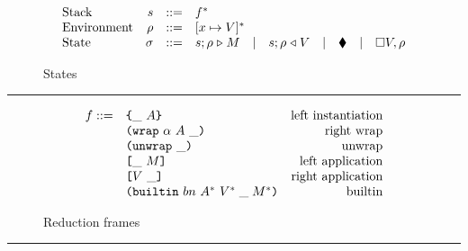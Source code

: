 \begin{figure*}[!ht]
\caption{The CEK Machine}\label{fig:cek-machine}

\begin{subfigure}[c]{\linewidth}        %
{\small
\caption{States}
\[
\begin{array}{lrcl}
        \textrm{Stack} & s      & ::= & f^*    \\
        \textrm{Environment} & \rho & ::= & [x \mapsto V]^* \\
        \textrm{State} & \sigma & ::= & s;\rho \mathrel\triangleright M \quad | \quad s;\rho \mathrel\triangleleft V  \quad | \quad \blacklozenge{} \quad | \quad \square V,\rho
    \end{array}
\]
}
\end{subfigure}

\vspace{3mm}
\hrule
\vspace{3mm}

\begin{subfigure}[c]{\linewidth}  %
{\small
\caption{Reduction frames}
\[
    \begin{array}{rlr}
       f ::= & \texttt{\{}\_ ~ A\texttt{\}}                     & \textrm{left instantiation}\\
             & \texttt{(} \texttt{wrap} ~ \alpha ~ A ~ \_ \texttt{)}            & \textrm{right wrap}\\
             & \texttt{(} \texttt{unwrap} ~ \_ \texttt{)}{}                        & \textrm{unwrap}\\
             & \texttt{[} \_ ~ M \texttt{]}                      & \textrm{left application}\\
             & \texttt{[} V ~ \_ \texttt{]}                     & \textrm{right application}\\
             & \texttt{(} \texttt{builtin} ~ bn ~ A^* ~ V^*\; \_\; M^* \texttt{)}        & \textrm{builtin}\\
    \end{array}
\]
}
\end{subfigure}

\vspace{3mm}
\hrule
\vspace{3mm}


\end{figure*}
